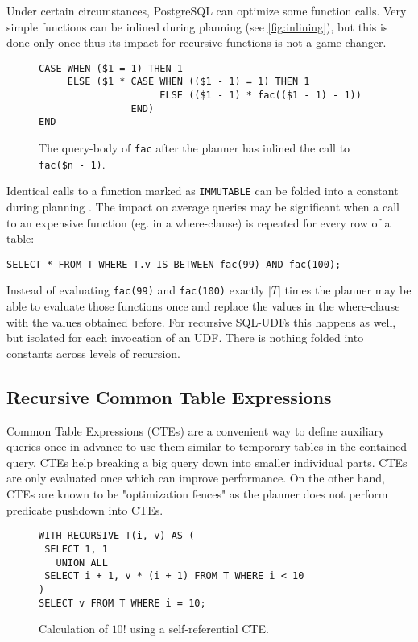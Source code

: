 Under certain circumstances, PostgreSQL can optimize some function calls. Very simple functions can be inlined during planning \cite{psqlWikiUDFinlining} (see \autoref{fig:inlining}), but this is done only once thus its impact for recursive functions is not a game-changer.


\begin{figure}[h!]
    \centering
    \begin{verbatim}
CASE WHEN ($1 = 1) THEN 1
     ELSE ($1 * CASE WHEN (($1 - 1) = 1) THEN 1
                     ELSE (($1 - 1) * fac(($1 - 1) - 1))
                END)
END
    \end{verbatim}
    \caption{The query-body of \texttt{fac} after the planner has inlined the call to \texttt{fac(\$n - 1)}.}
    \label{fig:inlining}
\end{figure}

Identical calls to a function marked as \texttt{IMMUTABLE} can be folded into a constant during planning \cite[p. 995]{psql}. The impact on average queries may be significant when a call to an expensive function (eg. in a where-clause) is repeated for every row of a table:\\
\begin{verbatim}
SELECT * FROM T WHERE T.v IS BETWEEN fac(99) AND fac(100);
\end{verbatim}
Instead of evaluating \texttt{fac(99)} and \texttt{fac(100)} exactly $|T|$ times the planner may be able to evaluate those functions once and replace the values in the where-clause with the values obtained before. For recursive SQL-UDFs this happens as well, but isolated for each invocation of an UDF. There is nothing folded into constants across levels of recursion.

\subsection{Recursive Common Table Expressions}

Common Table Expressions (CTEs) are a convenient way to define auxiliary queries once in advance to use them similar to temporary tables in the contained query. CTEs help breaking a big query down into smaller individual parts. CTEs are only evaluated once which can improve performance. On the other hand, CTEs are known to be "optimization fences" as the planner does not perform predicate pushdown into CTEs.


\begin{figure}[h!]
    \centering
    \begin{verbatim}
WITH RECURSIVE T(i, v) AS (
 SELECT 1, 1
   UNION ALL
 SELECT i + 1, v * (i + 1) FROM T WHERE i < 10
)
SELECT v FROM T WHERE i = 10;
    \end{verbatim}
    \caption{Calculation of $10!$ using a self-referential CTE.}
    \label{fig:my_label}
\end{figure}


